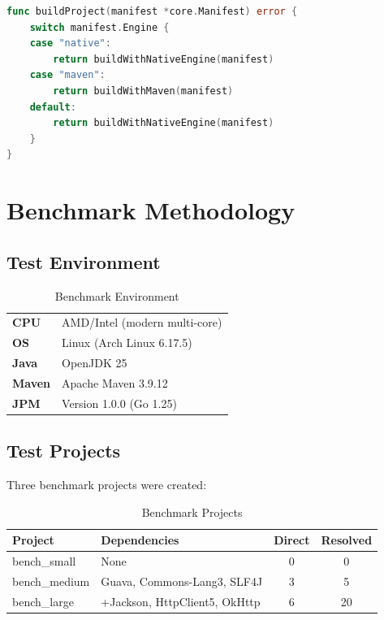 \documentclass[12pt,a4paper]{report}
\begin{document}
\begin{lstlisting}[language=Go, caption=Engine Selection Logic]
func buildProject(manifest *core.Manifest) error {
    switch manifest.Engine {
    case "native":
        return buildWithNativeEngine(manifest)
    case "maven":
        return buildWithMaven(manifest)
    default:
        return buildWithNativeEngine(manifest)
    }
}
\end{lstlisting}

\section{Benchmark Methodology}

\subsection{Test Environment}

\begin{table}[H]
\centering
\begin{tabular}{ll}
\toprule
\textbf{CPU} & AMD/Intel (modern multi-core) \\
\textbf{OS} & Linux (Arch Linux 6.17.5) \\
\textbf{Java} & OpenJDK 25 \\
\textbf{Maven} & Apache Maven 3.9.12 \\
\textbf{JPM} & Version 1.0.0 (Go 1.25) \\
\bottomrule
\end{tabular}
\caption{Benchmark Environment}
\end{table}

\subsection{Test Projects}

Three benchmark projects were created:

\begin{table}[H]
\centering
\begin{tabular}{llcc}
\toprule
\textbf{Project} & \textbf{Dependencies} & \textbf{Direct} & \textbf{Resolved} \\
\midrule
bench\_small & None & 0 & 0 \\
bench\_medium & Guava, Commons-Lang3, SLF4J & 3 & 5 \\
bench\_large & +Jackson, HttpClient5, OkHttp & 6 & 20 \\
\bottomrule
\end{tabular}
\caption{Benchmark Projects}
\end{table}
\end{document}
